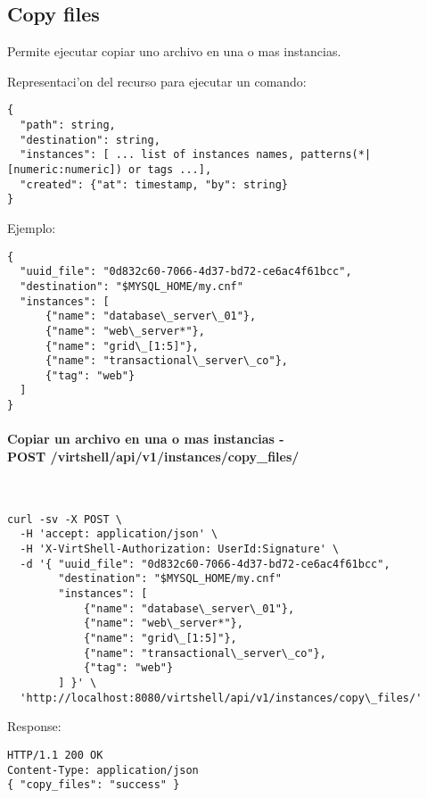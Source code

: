 \subsection{Copy files}

Permite ejecutar copiar uno archivo en una o mas instancias.

Representaci'on del recurso para ejecutar un comando:

\medskip
\begin{lstlisting}[style=json]
{
  "path": string,
  "destination": string,
  "instances": [ ... list of instances names, patterns(*|[numeric:numeric]) or tags ...],
  "created": {"at": timestamp, "by": string}
}
\end{lstlisting}

Ejemplo:

\medskip
\begin{lstlisting}[style=json]
{
  "uuid_file": "0d832c60-7066-4d37-bd72-ce6ac4f61bcc",
  "destination": "$MYSQL_HOME/my.cnf"
  "instances": [
      {"name": "database\_server\_01"},
      {"name": "web\_server*"},
      {"name": "grid\_[1:5]"},
      {"name": "transactional\_server\_co"},
      {"tag": "web"}
  ]
}
\end{lstlisting}

\paragraph{Copiar un archivo en una o mas instancias - \\ POST /virtshell/api/v1/instances/copy\_files/} ~\\

\begin{lstlisting}[style=json]
curl -sv -X POST \
  -H 'accept: application/json' \
  -H 'X-VirtShell-Authorization: UserId:Signature' \
  -d '{ "uuid_file": "0d832c60-7066-4d37-bd72-ce6ac4f61bcc",
        "destination": "$MYSQL_HOME/my.cnf"
        "instances": [
            {"name": "database\_server\_01"},
            {"name": "web\_server*"},
            {"name": "grid\_[1:5]"},
            {"name": "transactional\_server\_co"},
            {"tag": "web"}
        ] }' \
  'http://localhost:8080/virtshell/api/v1/instances/copy\_files/'
\end{lstlisting}

Response:

\begin{lstlisting}[style=json]
HTTP/1.1 200 OK
Content-Type: application/json
{ "copy_files": "success" }
\end{lstlisting}
